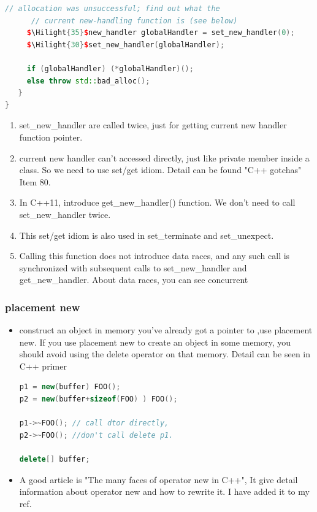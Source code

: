 \documentclass[a4paper,12pt,twoside]{book}
\newcommand{\Hilight}[1]{\makebox[0pt][l]{\color{yellow}\rule[-3pt]{#1em}{11pt}}}
\begin{document}
\begin{itemize}
\begin{lstlisting}[frame=single, language=c++]
      // allocation was unsuccessful; find out what the
      // current new-handling function is (see below)
     $\Hilight{35}$new_handler globalHandler = set_new_handler(0);
     $\Hilight{30}$set_new_handler(globalHandler);

     if (globalHandler) (*globalHandler)();
     else throw std::bad_alloc();
   }
}
\end{lstlisting}

\begin{enumerate}
\item set\_new\_handler are called twice, just for getting current new handler function pointer.

\item current new handler can't accessed directly, just like private member inside a class. So we need to use set/get idiom. Detail can be found "C++ gotchas" Item 80.
 
\item In C++11, introduce get\_new\_handler() function. We don't need to call set\_new\_handler twice.

\item This set/get idiom is also used in set\_terminate and set\_unexpect. 

\item Calling this function does not introduce data races, and any such call is synchronized with subsequent calls to set\_new\_handler and get\_new\_handler. About data races, you can see concurrent 
\end{enumerate}


\end{itemize}

\subsubsection{placement new}

\begin{itemize}
\item construct an object in memory you've already got a pointer to ,use placement new. If you use placement new to create an object in some memory, you should avoid using the delete operator on that memory.  Detail can be seen in C++ primer
\begin{lstlisting}[frame=single, language=c++]
p1 = new(buffer) FOO();
p2 = new(buffer+sizeof(FOO) ) FOO();

p1->~FOO(); // call dtor directly,
p2->~FOO(); //don't call delete p1.

delete[] buffer;
\end{lstlisting}

\item A good article is "The many faces of operator new in C++", It give  detail information about operator new and how to rewrite it. I have added it to my ref.
\end{itemize}
\end{document}
